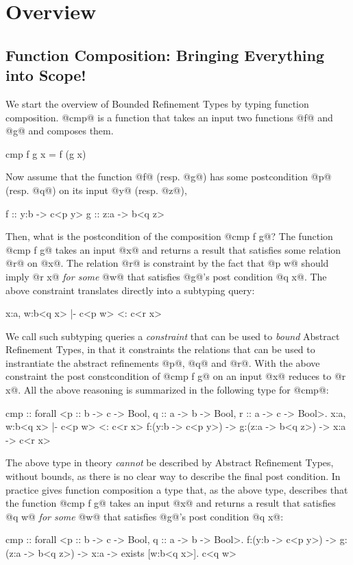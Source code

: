 \section{Overview}\label{sec:boundedrefinementtypes:overview}
\begin{comment}
<->append 
- complete cmp complete
<-> composition cmp A
- filter cmp Kaki
- state cmp Nik
\end{comment}

\subsection{Function Composition: Bringing Everything into Scope!}

We start the overview of Bounded Refinement Types by typing function composition.
%
@cmp@ is a function that takes an input two functions @f@ and @g@ and composes them.
%
\begin{code}
cmp f g x = f (g x)
\end{code}
%
Now assume that the function @f@ (resp. @g@) has some postcondition @p@ (resp. @q@) on its input @y@ (resp. @z@), \ie
%
\begin{code}
  f :: y:b -> c<p y> 
  g :: z:a -> b<q z>
\end{code}
%
Then, what is the postcondition of the composition @cmp f g@?
%
The function @cmp f g@ takes an input @x@ and returns a result that satisfies some 
relation @r@ on @x@. 
%
The relation @r@ is constraint by the fact that @p w@ should imply @r x@
\textit{for some} @w@ that satisfies @g@'s post condition @q x@.
%
The above constraint translates directly into a subtyping query:
\begin{code}
  {x:a, w:b<q x> |- c<p w> <: c<r x>}
\end{code}
We call such subtyping queries a \textit{constraint} that can be used to 
\textit{bound} Abstract Refinement Types, in that it constraints the relations
that can be used to instrantiate the abstract refinements @p@, @q@ and @r@.
%
With the above constraint the post constcondition of @cmp f g@
on an input @x@ reduces to @r x@.
%
All the above reasoning is summarized in the following type for @cmp@:
\begin{code}
cmp :: forall <p :: b -> c -> Bool, q :: a -> b -> Bool, r :: a -> c -> Bool>. 
       {x:a, w:b<q x> |- c<p w> <: c<r x>}
       f:(y:b -> c<p y>)
    -> g:(z:a -> b<q z>)
    ->   x:a -> c<r x>
\end{code}
%

The above type in theory \textit{cannot} be described by Abstract Refinement Types, 
without bounds, as there is no clear way to describe the final post condition. 
%
In practice \toolname gives function composition a type that, as the above type,
describes that 
the function @cmp f g@ takes an input @x@ and returns a result that satisfies 
@q w@
\textit{for some} @w@ that satisfies @g@'s post condition @q x@:
%
\begin{code}
cmp :: forall <p :: b -> c -> Bool, q :: a -> b -> Bool>. 
       f:(y:b -> c<p y>)
    -> g:(z:a -> b<q z>)
    ->  x:a -> exists [w:b<q x>]. c<q w>
\end{code}

